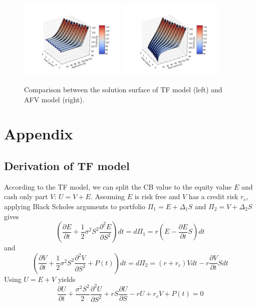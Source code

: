 \documentclass[12pt]{article}
\begin{document}
\begin{figure}[!htbp]
\centering
\includegraphics[width=0.45\textwidth]{Figures/TF_model.png}
\includegraphics[width=0.45\textwidth]{Figures/AFV_model.png}
\caption{Comparison between the solution surface of TF model (left) and AFV model (right).}
\label{fig:AFV_TF}
\end{figure}

\section{Appendix}
\subsection{Derivation of TF model}
According to the TF model, we can split the CB value to the equity value $E$ and cash only part $V$: $U = V + E$. Assuming $E$ is risk free and $V$ has a credit risk $r_c$, applying Black Scholes arguments to portfolio $\Pi_1 = E + \Delta_1 S$ and $\Pi_2 = V + \Delta_2 S$ gives
\begin{equation*}
(\frac{\partial E}{\partial t} + \frac{1}{2}\sigma^2S^2\frac{\partial^2E}{\partial S^2})dt = d\Pi_1 = r(E - \frac{\partial E}{\partial t}S)dt
\end{equation*}
and
\begin{equation*}
(\frac{\partial V}{\partial t} + \frac{1}{2}\sigma^2S^2\frac{\partial^2V}{\partial S^2} + P(t))dt = d\Pi_2 = (r+r_c)Vdt - r\frac{\partial V}{\partial t}Sdt
\end{equation*}
Using $U = E + V$ yields
\begin{equation*}
\frac{\partial{U}}{\partial{t}} + 
\frac{\sigma^2S^2}{2}\frac{\partial^2{U}}{\partial{S}^2} + rS\frac{\partial{U}}{\partial{S}} - rU + r_cV + P(t) = 0 
\end{equation*}
\end{document}
